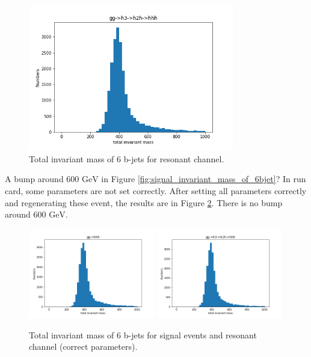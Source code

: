 \documentclass[12pt]{article}
\begin{document}
	\begin{figure}[htpb]
		\centering
		\includegraphics[width=0.8\textwidth]{signal_resonant_6_b-jets_total_invariant_mass.png}
		\caption{Total invariant mass of 6 b-jets for resonant channel.}
		\label{fig:resonant_channel_invariant_mass_of_6bjet}
	\end{figure}

	A bump around $\text{600 GeV}$ in Figure \ref{fig:signal_invariant_mass_of_6bjet}? In run card, some parameters are not set correctly. After setting all parameters correctly and regenerating these event, the results are in Figure \ref{fig:invariant_mass_of_6bjet_correct}. There is no bump around $\text{600 GeV}$.

	\begin{figure}[htpb]
		\centering
		\includegraphics[width=0.49\textwidth]{signal_6_b-jets_total_invariant_mass_correct.png}
		\includegraphics[width=0.49\textwidth]{signal_resonant_6_b-jets_total_invariant_mass_correct.png}
		\caption{Total invariant mass of 6 b-jets for signal events and resonant channel (correct parameters).}
		\label{fig:invariant_mass_of_6bjet_correct}
	\end{figure}
\end{document}
